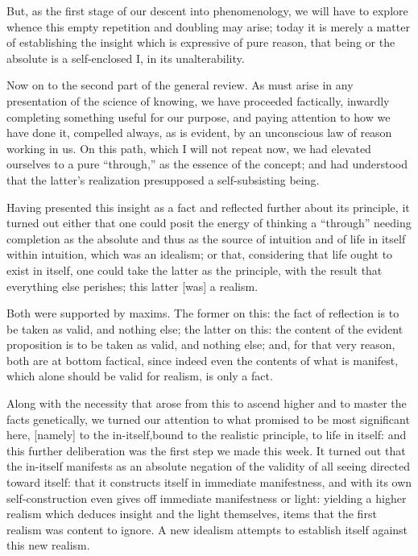 But, as the first stage of our descent into phenomenology,
we will have to explore whence this
empty  repetition and doubling may arise;
today it is merely a matter of establishing the insight
which is expressive of pure reason, that being or the absolute is
a self-enclosed I, in its unalterability.

Now on to the second part of the general review.
As must arise in any presentation of the science of knowing,
we have proceeded factically, inwardly completing
something useful for our purpose,
and paying attention to how we have done it,
compelled always, as is evident, by
an unconscious law of reason working in us.
On this path, which I will not repeat now,
we had elevated ourselves to a pure “through,”
as the essence of the concept;
and had understood that the latter’s realization
presupposed a self-subsisting being.

Having presented this insight as a fact
and reflected further about its principle,
it turned out either that one could posit
the energy of thinking a “through” needing
completion as the absolute
and thus as the source of intuition
and of life in itself within intuition,
which was an idealism;
or that, considering that life ought to exist in itself,
one could take the latter as the principle,
with the result that everything else perishes;
this latter [was] a realism.

Both were supported by maxims.
The former on this: the fact of reflection is
to be taken as valid, and nothing else;
the latter on this:
the content of the evident proposition is
to be taken as valid, and nothing else;
and, for that very reason, both are at bottom factical,
since indeed even the contents of what is manifest,
which alone should be valid for realism, is only a fact.

Along with the necessity that arose from this
to ascend higher and to master the facts genetically,
we turned our attention to what promised to be most significant here,
[namely] to the in-itself,bound to the realistic principle,
to life in itself:
and this further deliberation was the first step we made this week.
It turned out that the in-itself manifests as an absolute
negation of the validity of all seeing directed toward itself:
that it constructs itself in immediate manifestness,
and with its own self-construction even gives
off immediate manifestness or light:
yielding a higher realism which deduces
insight and the light themselves,
items that the first realism was content to ignore.
A new idealism attempts to establish itself
against this new realism.

